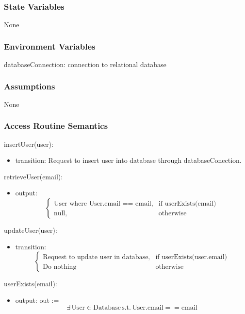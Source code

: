\documentclass[12pt, titlepage]{article}
\begin{document}
\subsubsection{State Variables}
None
\subsubsection{Environment Variables}
databaseConnection: connection to relational database

\subsubsection{Assumptions}
None

\subsubsection{Access Routine Semantics}

\noindent insertUser(user):
\begin{itemize}
\item transition: Request to insert user into database through databaseConection.
\end{itemize}

\noindent retrieveUser(email):
\begin{itemize}
\item output: 
\[
\begin{cases}
    \text{User where User.email == email}, & \text{if } \text{userExists(email)}\\
    \text{null}, & \text{otherwise}
\end{cases}
\]
\end{itemize}

\noindent updateUser(user):
\begin{itemize}
\item transition: 
\[
\begin{cases}
    \text{Request to update user in database}, & \text{if } \text{userExists(user.email)}\\
    \text{Do nothing} & \text{otherwise}
\end{cases}
\]
\end{itemize}

\noindent userExists(email):
\begin{itemize}
\item output: out := 
\[ \exists \, \text{User} \in \text{Database} \, \text{s.t.} \, \text{User.email} == \text{email}
\]
\end{itemize}
\end{document}
